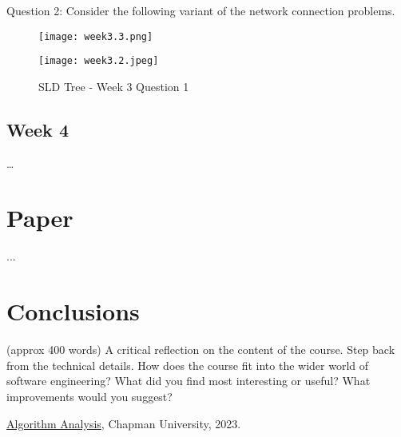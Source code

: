 \documentclass{article}
\theoremstyle{theorem}
\theoremstyle{definition}
\theoremstyle{remark}
\begin{document}
Question 2: Consider the following variant of the network connection problems.
\begin{figure}[h!]
    \centering
    \texttt{[image: week3.3.png]}
    \label{fig:SLD Tree - Week 3 Question 2}
\end{figure}
\begin{figure}[h!]
    \centering
    \texttt{[image: week3.2.jpeg]}
    \caption{SLD Tree - Week 3 Question 1}
    \label{fig:SLD Tree - Week 3 Question 2}
\end{figure}

\subsection{Week 4}

\ldots

\section{Paper}

...

\section{Conclusions}\label{conclusions}

(approx 400 words) A critical reflection on the content of the course. Step back from the technical details. How does the course fit into the wider world of software engineering? What did you find most interesting or useful? What improvements would you suggest?

\begin{thebibliography}{99}
 \href{https://github.com/alexhkurz/algorithm-analysis-2023}{Algorithm Analysis}, Chapman University, 2023.
\end{thebibliography}
\end{document}
